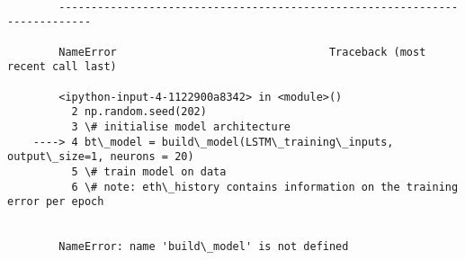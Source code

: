 \documentclass[11pt]{article}
\begin{document}
    \begin{Verbatim}[commandchars=\\\{\}]

        ---------------------------------------------------------------------------

        NameError                                 Traceback (most recent call last)

        <ipython-input-4-1122900a8342> in <module>()
          2 np.random.seed(202)
          3 \# initialise model architecture
    ----> 4 bt\_model = build\_model(LSTM\_training\_inputs, output\_size=1, neurons = 20)
          5 \# train model on data
          6 \# note: eth\_history contains information on the training error per epoch


        NameError: name 'build\_model' is not defined

    \end{Verbatim}
\end{document}
